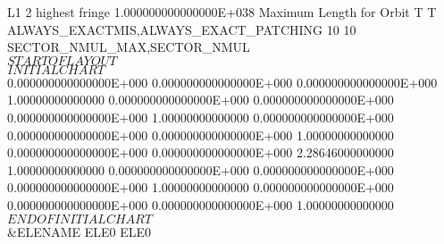 \begin{ptccode}
L1                                                                                                                      
           2  highest fringe   \label{lin:mu:quad}
  1.000000000000000E+038  Maximum Length for Orbit 
 T T ALWAYS_EXACTMIS,ALWAYS_EXACT_PATCHING  \label{lin:mu:mis}
          10          10  SECTOR_NMUL_MAX,SECTOR_NMUL  \label{lin:mu:sect}
  $$$$$$$$$$$$$$$$$ START OF LAYOUT $$$$$$$$$$$$$$$$$
  $$$$$$$$$$$$$$$$$ INITIAL CHART $$$$$$$$$$$$$$$$$
  0.000000000000000E+000  0.000000000000000E+000  0.000000000000000E+000
   1.00000000000000       0.000000000000000E+000  0.000000000000000E+000
  0.000000000000000E+000   1.00000000000000       0.000000000000000E+000
  0.000000000000000E+000  0.000000000000000E+000   1.00000000000000     
  0.000000000000000E+000  0.000000000000000E+000   2.28646000000000     
   1.00000000000000       0.000000000000000E+000  0.000000000000000E+000
  0.000000000000000E+000   1.00000000000000       0.000000000000000E+000
  0.000000000000000E+000  0.000000000000000E+000   1.00000000000000     
  $$$$$$$$$$$$$$$$$ END OF INITIAL CHART $$$$$$$$$$$$$$$$$   \label{lin:mu:chart}
 &ELENAME
 ELE0%
 ELE0%
\end{ptccode}

